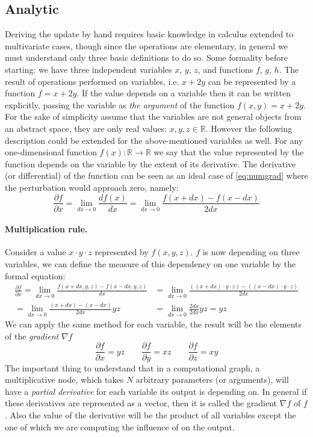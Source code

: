 \subsection{Analytic}
Deriving the update by hand requires basic knowledge in calculus extended to multivariate cases, though since the operations are elementary, in general we must understand only three basic definitions to do so. 
Some formality before starting: we have three independent variables $x$, $y$, $z$, and functions $f$, $g$, $h$. The result of operations performed on variables, i.e. $x+2y$ can be represented by a function $f=x+2y$. 
If the value depends on a variable then it can be written explicitly, passing the variable as \emph{the argument} of the function $f(x,y)=x+2y$. 
For the sake of simplicity assume that the variables are not general objects from an abstract space, they are only real values: $x,y,z\in \mathbb{R}$. However the following description could be extended for the above-mentioned variables as well. For any one-dimensional function $f(x):\mathbb{R}\rightarrow\mathbb{R}$ we say that the value represented by the function depends on the variable by the extent of its derivative. The derivative (or differential) of the function can be seen as an ideal case of \ref{eq:numgrad} where the perturbation would approach zero, namely:
\begin{equation}
    \frac{\partial f}{\partial x} = \lim_{dx\rightarrow 0}\frac{df(x)}{dx}= \lim_{dx\rightarrow 0} \frac{f(x+dx)-f(x-dx)}{2dx}
\end{equation}
\paragraph{Multiplication rule.}
Consider a value $x\cdot y \cdot z$ represented by $f(x,y,z)$. $f$ is now depending on three variables, we can define the measure of this dependency on one variable by the formal equation:
\begin{equation*}
\begin{split}
    \frac{\partial f}{\partial x} = \lim_{dx\rightarrow 0} \frac{f(x+dx,y,z)-f(x-dx,y,z)}{dx}
    &= \lim_{dx\rightarrow 0} \frac{((x+dx)\cdot y \cdot z)-((x-dx)\cdot y \cdot z)}{2dx} \\
    = \lim_{dx\rightarrow 0} \frac{(x+dx)-(x-dx)}{2dx} y z&= \lim_{dx\rightarrow 0} \frac{2dx}{2dx} yz= yz
\end{split}
\end{equation*}
We can apply the same method for each variable, the result will be the elements of the \emph{gradient} $\nabla f$
\begin{equation}
    \frac{\partial f}{\partial x} = y z \qquad
    \frac{\partial f}{\partial y} = x z \qquad
    \frac{\partial f}{\partial z} = x y 
\end{equation} 
The important thing to understand that in a computational graph, a multiplicative node, which takes $N$ arbitrary parameters (or arguments), will have a \emph{partial derivative} for each variable its output is depending on. In general if these derivatives are represented as a vector, then it is called the gradient $\nabla f$ of $f$. Also the value of the derivative will be the product of all variables except the one of which we are computing the influence of on the output.

